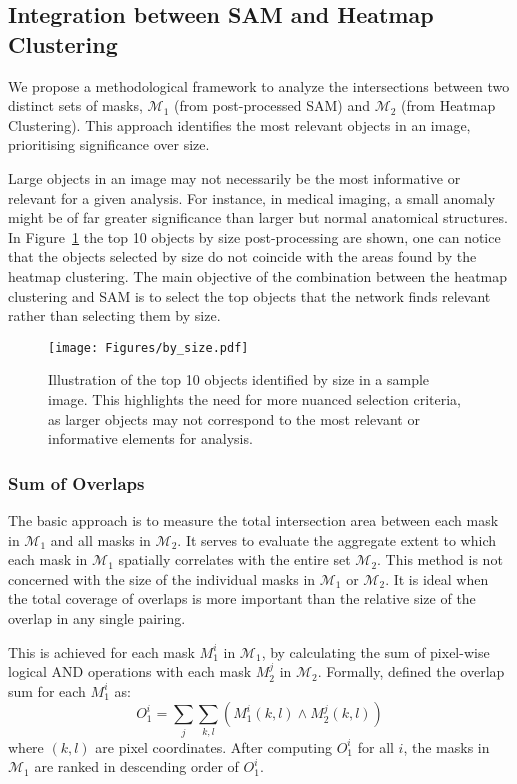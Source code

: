 \subsection{Integration between SAM and Heatmap Clustering}
\label{sec:integration}
We propose a methodological framework to analyze the intersections between two distinct sets of masks, \(\mathcal{M}_1\) (from post-processed SAM) and \(\mathcal{M}_2\) (from Heatmap Clustering). This approach identifies the most relevant objects in an image, prioritising significance over size.
 
Large objects in an image may not necessarily be the most informative or relevant for a given analysis. For instance, in medical imaging, a small anomaly might be of far greater significance than larger but normal anatomical structures. In Figure~\ref{Fig:large} the top 10 objects by size post-processing are shown, one can notice that the objects selected by size do not coincide with the areas found by the heatmap clustering. The main objective of the combination between the heatmap clustering and SAM is to select the top objects that the network finds relevant rather than selecting them by size.

\begin{figure}[ht!]
\begin{center}
\texttt{[image: Figures/by\_size.pdf]}
\end{center}
\caption{Illustration of the top 10 objects identified by size in a sample image. This highlights the need for more nuanced selection criteria, as larger objects may not correspond to the most relevant or informative elements for analysis.}
\label{Fig:large}
\end{figure} 


\subsubsection{Sum of Overlaps} 

The basic approach is to measure the total intersection area between each mask in \(\mathcal{M}_1\) and all masks in \(\mathcal{M}_2\).  It serves to evaluate the aggregate extent to which each mask in \(\mathcal{M}_1\) spatially correlates with the entire set \(\mathcal{M}_2\). This method is not concerned with the size of the individual masks in \(\mathcal{M}_1\) or \(\mathcal{M}_2\). It is ideal when the total coverage of overlaps is more important than the relative size of the overlap in any single pairing.

This is achieved for each mask \( M_1^i \) in \(\mathcal{M}_1\), by calculating the sum of pixel-wise logical AND operations with each mask \( M_2^j \) in \(\mathcal{M}_2\). Formally, defined the overlap sum for each \( M_1^i \) as:
\begin{equation*}
    O_1^i = \sum_{j} \sum_{k, l} \left( M_1^i(k, l) \land M_2^j(k, l) \right)
\end{equation*}
where \( (k, l) \) are pixel coordinates. After computing \( O_1^i \) for all \( i \),  the masks in \(\mathcal{M}_1\) are ranked in descending order of \( O_1^i \). 

